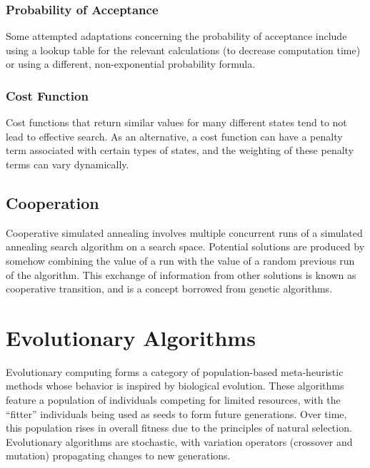 \documentclass[12pt,titlepage]{article}
\begin{document}
      \subsubsection{Probability of Acceptance}
        Some attempted adaptations concerning the probability of acceptance include using a lookup table for the relevant calculations (to decrease computation time) or using a different,
        non-exponential probability formula.

      \subsubsection{Cost Function}
        Cost functions that return similar values for many different states tend to not lead to effective search. As an alternative, a cost function can have a penalty term associated with
        certain types of states, and the weighting of these penalty terms can vary dynamically.

    \subsection{Cooperation}
      Cooperative simulated annealing involves multiple concurrent runs of a simulated annealing search algorithm on a search space. Potential solutions are produced by somehow combining
      the value of a run with the value of a random previous run of the algorithm. This exchange of information from other solutions is known as cooperative transition, and is a concept
      borrowed from genetic algorithms.

  \section{Evolutionary Algorithms}
    Evolutionary computing forms a category of population-based meta-heuristic methods whose behavior is inspired by biological evolution. These algorithms feature a population of
    individuals competing for limited resources, with the ``fitter'' individuals being used as seeds to form future generations. Over time, this population rises in overall fitness
    due to the principles of natural selection. Evolutionary algorithms are stochastic, with variation operators (crossover and mutation) propagating changes to new generations.
\end{document}
